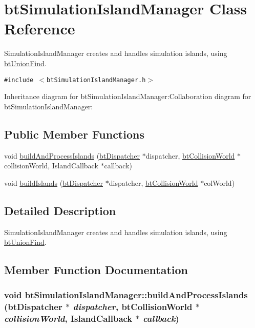 \hypertarget{classbt_simulation_island_manager}{
\section{btSimulationIslandManager Class Reference}
\label{classbt_simulation_island_manager}
}
SimulationIslandManager creates and handles simulation islands, using \hyperlink{classbt_union_find}{btUnionFind}.  


{\tt \#include $<$btSimulationIslandManager.h$>$}

Inheritance diagram for btSimulationIslandManager:Collaboration diagram for btSimulationIslandManager:\subsection*{Public Member Functions}
\begin{CompactItemize}
\item 
void \hyperlink{classbt_simulation_island_manager_b0f52dc46bc01c6754f4cb32ba26c99a}{buildAndProcessIslands} (\hyperlink{classbt_dispatcher}{btDispatcher} $\ast$dispatcher, \hyperlink{classbt_collision_world}{btCollisionWorld} $\ast$collisionWorld, IslandCallback $\ast$callback)
\item 
void \hyperlink{classbt_simulation_island_manager_ea0b5869eca2d034ac9c643e149a5e01}{buildIslands} (\hyperlink{classbt_dispatcher}{btDispatcher} $\ast$dispatcher, \hyperlink{classbt_collision_world}{btCollisionWorld} $\ast$colWorld)
\end{CompactItemize}


\subsection{Detailed Description}
SimulationIslandManager creates and handles simulation islands, using \hyperlink{classbt_union_find}{btUnionFind}. 

\subsection{Member Function Documentation}
\hypertarget{classbt_simulation_island_manager_b0f52dc46bc01c6754f4cb32ba26c99a}{
\subsubsection[buildAndProcessIslands]{\setlength{\rightskip}{0pt plus 5cm}void btSimulationIslandManager::buildAndProcessIslands ({\bf btDispatcher} $\ast$ {\em dispatcher}, \/  {\bf btCollisionWorld} $\ast$ {\em collisionWorld}, \/  IslandCallback $\ast$ {\em callback})}}
\label{classbt_simulation_island_manager_b0f52dc46bc01c6754f4cb32ba26c99a}


